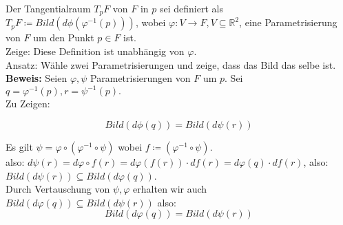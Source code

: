 \begin{problem*}[2a]
Der Tangentialraum $ T_pF$ von $ F $ in $ p $ sei definiert als $ T_pF \coloneqq Bild(d \phi (\varphi^{ -1 }(p))) $, wobei $\varphi: V \to F, V \subseteq \mathbb{ R }^2$, eine Parametrisierung von $ F $ um den Punkt $ p \in F$ ist.\\
Zeige: Diese Definition ist unabhängig von $\varphi$.\\
Ansatz: Wähle zwei Parametrisierungen und zeige, dass das Bild das selbe ist.\\
\textbf{Beweis:} Seien $ \varphi, \psi$ Parametrisierungen von $ F $ um $ p $. Sei $q=\varphi^{ -1 }(p), r=\psi^{ -1 }(p).$\\
Zu Zeigen:

\begin{equation*}
Bild(d \phi(q)) = Bild(d \psi(r))
\end{equation*}

Es gilt $\psi = \varphi \circ (\varphi^{ -1 }\circ \psi)$ wobei $f \coloneqq (\varphi^{ -1 }\circ \psi)$.\\
also: $d \psi(r) = d \varphi \circ f(r) = d \varphi(f(r)) \cdot df(r) = d \varphi(q) \cdot df(r)$, also:\\
$Bild(d \psi(r)) \subseteq Bild(d\varphi(q))$.\\
Durch Vertauschung von $ \psi ,\varphi $ erhalten wir auch $Bild(d\varphi(q)) \subseteq Bild(d \psi(r))$ also: 
\begin{equation*}
  Bild(d\varphi(q)) = Bild(d \psi(r))
\end{equation*}

\end{problem*}

